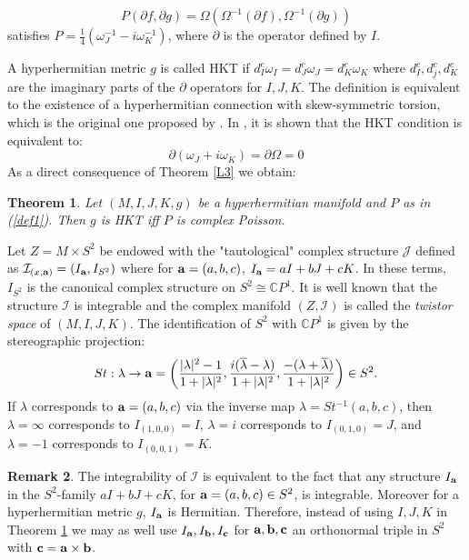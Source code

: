 \documentclass[11pt,oneside,leqno]{amsart}
\theoremstyle{plain}
\newtheorem{theorem}{Theorem}[section]
\theoremstyle{definition}
\newtheorem{rem}[theorem]{Remark}
\begin{document}
\begin{equation}\label{def1}
P(\partial f, \partial g) = \Omega(\Omega^{-1}(\partial f), \Omega^{-1}(\partial g))
\end{equation}
satisfies $P=\frac{1}{4}(\omega^{-1}_J-i\omega^{-1}_K)$, where $\partial$ is the operator defined by $I$.

 A hyperhermitian metric $g$ is called HKT if $d^c_I\omega_I=d^c_J\omega_J=d^c_K\omega_K$  where $d^c_I,d^c_j,d^c_K$ are the imaginary parts of the $\partial$ operators for $I,J,K$. The definition is equivalent to the existence of a hyperhermitian connection with skew-symmetric torsion, which is the original one proposed by \cite{HP}. In \cite{GP}, it is shown that the HKT condition is equivalent to: $$
\partial(\omega_J+i\omega_K)=\partial\Omega=0$$
As a direct consequence of Theorem \ref{L3} we obtain:

\begin{theorem}\label{L1}
Let $(M,I,J,K,g)$ be a hyperhermitian manifold and $P$ as in (\ref{def1}). Then $g$ is HKT iff $P$ is complex Poisson.

\end{theorem}

Let $Z = M\times S^2$ be endowed with the "tautological" complex structure $\mathcal{J}$ defined as $\mathcal{I}_{(x,{\bf a})} = (I_{\bf a}, I_{S^2})$ where for ${\bf a} = (a,b,c)$, $I_{\bf a} = aI + b J + cK$. In these terms, $I_{S^2}$ is the canonical complex structure on $S^2\cong {\mathbb CP}^1$. It is well known that the structure $\mathcal{I}$ is integrable and the complex manifold $(Z,\mathcal{I})$ is called the {\it twistor space} of $(M, I, J, K)$. The identification of  $S^2$ with ${\mathbb C}P^1$ is given by the stereographic projection:
$$St:\lambda\rightarrow {\bf a} = \left (\frac{|\lambda|^2-1}{1+|\lambda|^2}, \frac{i(\overline{\lambda}-\lambda)}{1+|\lambda|^2}, \frac{-(\lambda+\overline{\lambda})}{1+|\lambda|^2} \right)\in S^2.$$
If $\lambda$ corresponds to ${\bf a} = (a,b,c)$ via the inverse map $\lambda = St^{-1}(a,b,c)$, then $\lambda = \infty$ corresponds to $I_{(1,0,0)} = I$, $\lambda = i$ corresponds to $I_{(0,1,0)} = J$, and $\lambda = -1$ corresponds to $I_{(0,0,1)} = K$.

\begin{rem}\label{L1gen}
The integrability of $\mathcal{I}$ is equivalent to the fact that any structure $I_{\bf a}$ in the $S^2$-family $aI+bJ+cK$, for ${\bf a}=(a,b,c)\in S^2$, is integrable. Moreover for a hyperhermitian metric $g$, $I_{\bf a}$ is Hermitian. Therefore, instead of using $I,J,K$ in Theorem \ref{L1} we may as well use $I_{\bf{a}}, I_{\bf{b}},I_{\bf{c}}$ for $\bf{a},\bf{b},\bf{c}$ an orthonormal triple in $S^2$ with $\bf{c}=\bf{a}\times\bf{b}$.
\end{rem}
\end{document}
